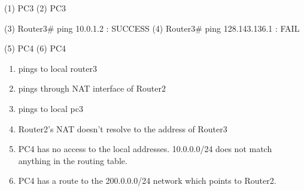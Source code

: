 (1) PC3%
(2) PC3%

(3) Router3# ping 10.0.1.2	: SUCCESS
(4) Router3# ping 128.143.136.1	: FAIL

(5) PC4%
(6) PC4%

\begin{enumerate}
\item pings to local router3
\item pings through NAT interface of Router2
\item pings to local pc3
\item Router2's NAT doesn't resolve to the address of Router3
\item PC4 has no access to the local addresses. 10.0.0.0/24 does not match anything in the routing table.
\item PC4 has a route to the 200.0.0.0/24 network which points to Router2.
\end{enumerate}